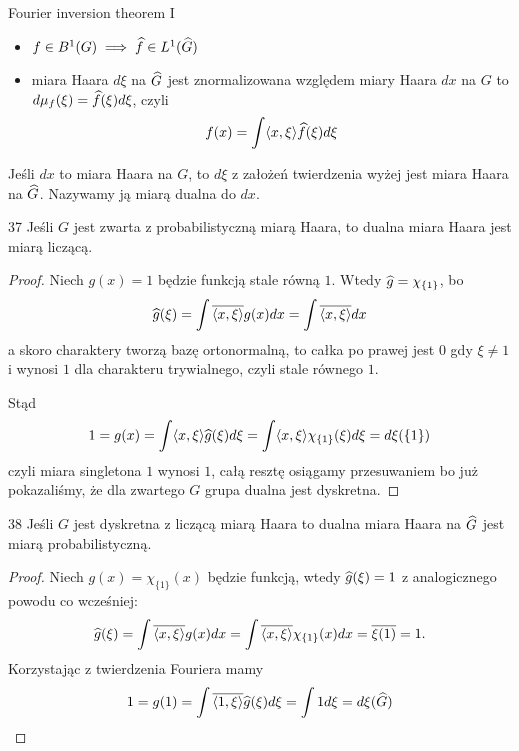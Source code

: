 \begin{theorem}{Fourier inversion theorem I}{}
  \begin{itemize}
    \item $f\in B^1(G)\implies \Hat{f}\in L^1(\Hat{G})$
    \item miara Haara $d\xi$ na $\Hat{G}$ jest znormalizowana względem miary Haara $dx$ na $G$ to $d\mu_f(\xi)=\Hat{f}(\xi)d\xi$, czyli
      $$f(x)=\int\langle x,\xi\rangle \Hat{f}(\xi)d\xi$$
  \end{itemize}
\end{theorem}

Jeśli $dx$ to miara Haara na $G$, to $d\xi$ z założeń twierdzenia wyżej jest miara Haara na $\Hat{G}$. Nazywamy ją miarą dualna do $dx$.

\begin{zadanie}{3}{7}
  Jeśli $G$ jest zwarta z probabilistyczną miarą Haara, to dualna miara Haara jest miarą liczącą.
\end{zadanie}

\begin{proof}
  Niech $g(x)=1$ będzie funkcją stale równą $1$. Wtedy $\Hat{g}=\chi_{\{1\}}$, bo 
  $$\Hat{g}(\xi)=\int \overline{\langle x, \xi\rangle}g(x)dx=\int \overline{\langle x,\xi\rangle}dx$$
  a skoro charaktery tworzą bazę ortonormalną, to całka po prawej jest $0$ gdy $\xi\neq 1$ i wynosi $1$ dla charakteru trywialnego, czyli stale równego $1$. 

  Stąd 
  $$1=g(x)=\int \langle x, \xi\rangle \Hat{g}(\xi)d\xi=\int\langle x,\xi\rangle \chi_{\{1\}}(\xi)d\xi=d\xi(\{1\})$$
  czyli miara singletona $1$ wynosi $1$, całą resztę osiągamy przesuwaniem bo już pokazaliśmy, że dla zwartego $G$ grupa dualna jest dyskretna.
\end{proof}

\begin{zadanie}{3}{8}
  Jeśli $G$ jest dyskretna z liczącą miarą Haara to dualna miara Haara na $\Hat{G}$ jest miarą probabilistyczną.
\end{zadanie}

\begin{proof}
  Niech $g(x)=\chi_{\{1\}}(x)$ będzie funkcją, wtedy $\Hat{g}(\xi)=1$ z analogicznego powodu co wcześniej:
  $$\Hat{g}(\xi)=\int \overline{\langle x,\xi\rangle}g(x)dx=\int \overline{\langle x, \xi\rangle}\chi_{\{1\}}(x)dx=\overline{\xi(1)}=1.$$
  Korzystając z twierdzenia Fouriera mamy
  $$1=g(1)=\int\overline{\langle 1, \xi\rangle}\Hat{g}(\xi)d\xi=\int 1d\xi=d\xi(\Hat{G})$$
\end{proof}









